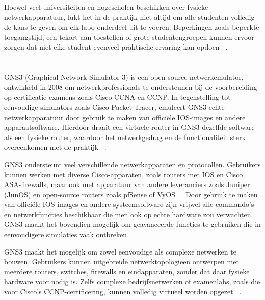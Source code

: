 \vspace{0.3cm}

Hoewel veel universiteiten en hogescholen beschikken over fysieke netwerkapparatuur, lukt het in de praktijk niet altijd om alle studenten volledig de kans te geven om elk labo-onderdeel uit te voeren. Beperkingen zoals beperkte toegangstijd, een tekort aan toestellen of grote studentengroepen kunnen ervoor zorgen dat niet elke student evenveel praktische ervaring kan opdoen ~\autocite{inproceedings}.




\section{}%
\label{sec:GNS3}

GNS3 (Graphical Network Simulator 3) is een open-source netwerkemulator, ontwikkeld in 2008 om netwerkprofessionals te ondersteunen bij de voorbereiding op certificatie-examens zoals Cisco CCNA en CCNP. In tegenstelling tot eenvoudige simulators zoals Cisco Packet Tracer, emuleert GNS3 echte netwerkapparatuur door gebruik te maken van officiële IOS-images en andere apparaatsoftware. Hierdoor draait een virtuele router in GNS3 dezelfde software als een fysieke router, waardoor het netwerkgedrag en de functionaliteit sterk overeenkomen met de praktijk ~\autocite{Kuzmenko2016}.

\vspace{0.3cm}

GNS3 ondersteunt veel verschillende netwerkapparaten en protocollen. Gebruikers kunnen werken met diverse Cisco-apparaten, zoals routers met IOS en Cisco ASA-firewalls, maar ook met apparatuur van andere leveranciers zoals Juniper (JunOS) en open-source routers zoals pfSense of VyOS ~\autocite{Amrizal2022}. Door gebruik te maken van officiële IOS-images en andere systeemsoftware zijn vrijwel alle commando’s en netwerkfuncties beschikbaar die men ook op echte hardware zou verwachten. GNS3 maakt het bovendien mogelijk om geavanceerde functies te gebruiken die in eenvoudigere simulaties vaak ontbreken ~\autocite{gns3_docs2025}.

\vspace{0.3cm}

GNS3 maakt het mogelijk om zowel eenvoudige als complexe netwerken te bouwen. Gebruikers kunnen uitgebreide netwerktopologieën ontwerpen met meerdere routers, switches, firewalls en eindapparaten, zonder dat daar fysieke hardware voor nodig is. Zelfs complexe bedrijfsnetwerken of examenlabs, zoals die voor Cisco’s CCNP-certificering, kunnen volledig virtueel worden opgezet ~\autocite{Gil2015}.

